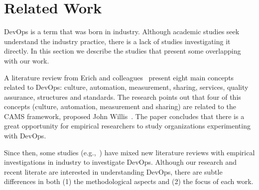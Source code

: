 \section{Related Work} \label{sec:related_work}

DevOps is a term that was born in industry. Although academic studies seek
understand the industry practice, there is a lack of studies investigating it
directly. In this section we describe the studies that present some overlapping 
with  our work.

A literature review from Erich and colleagues~\cite{cooperation_dev_ops_esem_2014} present eight
main concepts related to DevOps: culture, automation, measurement, sharing,
services, quality assurance, structures and standards. The research points out
that four of this concepts (culture, automation, measurement and sharing) are
related to the CAMS framework, proposed John Willis~\cite{what_devops_means_2010}. 
The paper concludes that there is a great opportunity for empirical researchers 
to study organizations experimenting with DevOps.

Since then, some studies (e.g.,~\cite{devops_a_definition_xp_15,dimensions_of_devops_xp_15,extending_dimensions_icsea_16,characterizing_devops_sbes_2016,qualitative_devops_journalsw_17}) 
have mixed new literature reviews with empirical investigations in industry to investigate DevOps.
Although our research and recent literate are interested in understanding DevOps,
there are subtle differences in both (1) the methodological aspects and (2) the focus
of each work. 




